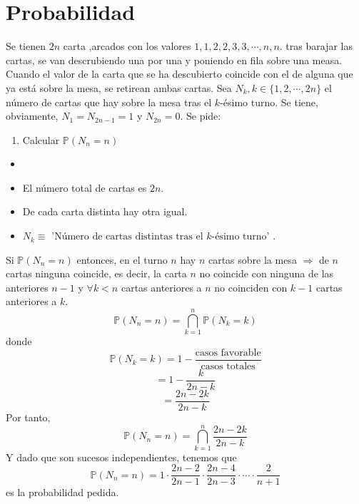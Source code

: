 
\chapter{Probabilidad}

\begin{ejr}
  Se tienen $2n$ carta ,arcados con los valores $1,1,2,2,3,3, \cdots, n,n$. tras barajar las cartas, se van descrubiendo una por una y poniendo en fila sobre una measa. Cuando el valor de la carta que se ha descubierto coincide con el de alguna que ya está sobre la mesa, se retirean ambas cartas. Sea $N_{k}, k \in \{ 1,2,\cdots , 2n \}$ el número de cartas que hay sobre la mesa tras el $k$-ésimo turno. Se tiene, obviamente, $N_{1} = N_{2n -1} = 1$ y $N_{2n} = 0$. Se pide:
  \begin{enumerate}[label=(\roman*)]
    \item Calcular $\mathbb{P}(N_{n} = n)$
  \end{enumerate}
\end{ejr}

\begin{sol}
  \begin{itemize}
    \item []
    \item El número total de cartas es $2n$.
    \item De cada carta distinta hay otra igual.
    \item $N_{k} \equiv \text{ 'Número de cartas distintas tras el $k$-ésimo turno' }$.
  \end{itemize}

  Si $\mathbb{P}(N_{n} = n)$ entonces, en el turno $n$ hay $n$ cartas sobre la mesa $\Rightarrow$ de $n$ cartas ninguna coincide, es decir, la carta $n$ no coincide con ninguna de las anteriores $n-1$ y $\forall k < n$ cartas anteriores a $n$ no coinciden con $k-1$ cartas anteriores a $k$.
  \[ 
    \mathbb{P}(N_{n} = n) = \bigcap_{k =1}^{n} \mathbb{P}(N_{k} = k)
  \] 
  donde
  \[ 
    \mathbb{P}(N_{k} = k) = 1 - \frac{\text{casos favorable}}{\text{casos totales}} 
  \] 
  \[ 
    = 1 - \frac{k}{2n - k}  
  \] 
  \[ 
    = \frac{2n - 2k }{2n - k} 
  \] 
  Por tanto,
  \[ 
    \mathbb{P}(N_{n} = n) = \bigcap_{k = 1}^{n} \frac{2n - 2k}{2n - k}
  \] 
  Y dado que son sucesos independientes, tenemos que
  \[ 
    \mathbb{P}(N_{n} = n) = 1 \cdot \frac{2n - 2}{2n - 1} \cdot \frac{2n - 4}{2n - 3} \cdot \cdots \cdot \frac{2}{n + 1} 
  \] 
  es la probabilidad pedida.
\end{sol}
